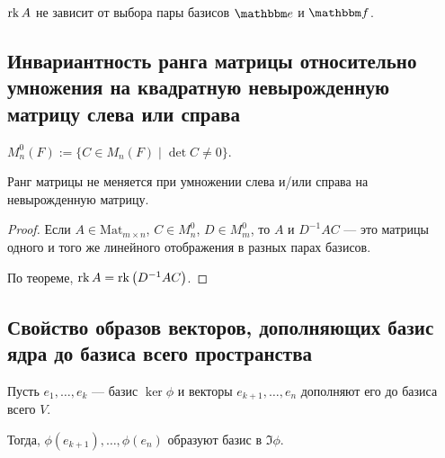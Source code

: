 \begin{comment}
    Число $\dim \Im \phi$ называется \textit{рангом} линейного отображения $\phi$, обозначается $\rk \phi$.
\end{comment}

\begin{corollary}
    $\operatorname{\mathop{\mathrm{rk}}} A$ не зависит от выбора пары базисов $\E$ и $\F$.
\end{corollary}


\subsection{Инвариантность ранга матрицы относительно умножения на квадратную невырожденную матрицу слева или справа}

\begin{designation}
    $M^{0}_n(F) := \{ C \in M_n(F) \mid \det C \neq 0\}$.  
\end{designation}

\begin{corollary}
    Ранг матрицы не меняется при умножении слева и/или справа на невырожденную матрицу.
\end{corollary}

\begin{proof}
    Если $A \in \text{Mat}_{m \times n}$, $C \in M^{0}_n$, $D \in M_m^{0}$, то $A$ и $D^{-1}AC$ --- это матрицы одного и того же линейного отображения в разных парах базисов.

    По теореме, $\operatorname{\mathop{\mathrm{rk}}} A = \operatorname{\mathop{\mathrm{rk}}}\left(D^{-1}AC\right)$.
\end{proof}


\subsection{Свойство образов векторов, дополняющих базис ядра до базиса всего пространства}

\begin{proposal}
    Пусть $e_1, \dots, e_k$ --- базис $\ker \phi$ и векторы $e_{k + 1}, \dots, e_n$ дополняют его до базиса всего $V$.

    Тогда, $\phi(e_{k + 1}), \dots, \phi(e_n)$ образуют базис в $\Im \phi$.
\end{proposal}


